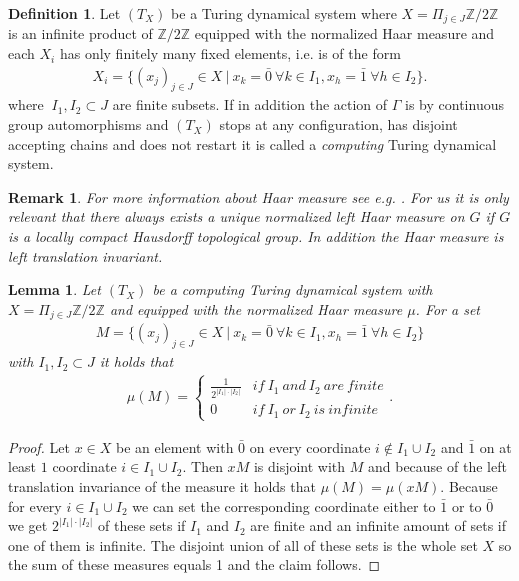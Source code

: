 \documentclass[12pt,a4paper]{scrartcl}
\theoremstyle{plain}
\newtheorem{Lemma}[Theorem]{Lemma}
\newtheorem{Remark}[Theorem]{Remark}
\theoremstyle{definition}
\newtheorem{Definition}[Theorem]{Definition}
\numberwithin{equation}{section}
\newcommand{\2}{\mathbb{Z} / 2 \mathbb{Z}}
\newcommand{\1}{\bar{1}}
\newcommand{\0}{\bar{0}}
\begin{document}
\begin{Definition}
	Let $(T_X)$ be a Turing dynamical system where $X = \Pi_{j \in J} \2$ is an infinite product of $\2$ equipped with the normalized Haar measure and each $X_i$  has only finitely many fixed elements, i.e. is of the form 
	\begin{align*}
		X_i = \{(x_j)_{j \in J} \in X \ | \ x_k = \0 \ \forall k \in I_1, x_h = \1 \ \forall h \in I_2\}.
	\end{align*}
	where $\ I_1, I_2 \subset J$ are finite subsets.
	If in addition the action of $\Gamma$ is by continuous group automorphisms and $(T_X)$ stops at any configuration, has disjoint accepting chains and does not restart it is called a \emph{computing} Turing dynamical system.
\end{Definition}
\begin{Remark}
	For more information about Haar measure see e.g. . For us it is only relevant that there always exists a unique normalized left Haar measure on $G$ if $G$ is a locally compact Hausdorff topological group. In addition the Haar measure is left translation invariant.
\end{Remark}
\begin{Lemma}
	Let $(T_X)$ be a computing Turing dynamical system with $X = \Pi_{j \in J} \2$ and equipped with the normalized Haar measure $\mu$. For a set 
	\begin{align*}
		M = \{(x_j)_{j \in J} \in X \ | \ x_k = \0 \ \forall k \in I_1, x_h = \1 \ \forall h \in I_2 \}
	\end{align*}
	with $I_1, I_2 \subset J$ it holds that
	\begin{align*}
	\mu (M) = \begin{cases}
	\frac{1}{2^{|I_1| \cdot |I_2|}} & if \ I_1 \ and \ I_2 \ are \ finite \\
	0 & if \ I_1 \ or \ I_2 \ is \ infinite
	\end{cases}.
	\end{align*}
\end{Lemma}
\begin{proof}
	Let $x \in X$ be an element with $\0$ on every coordinate $i \notin I_1 \cup I_2$ and $\1$ on at least $1$ coordinate $i \in I_1 \cup I_2$. Then $xM$ is disjoint with $M$ and because of the left translation invariance of the measure it holds that $\mu (M) = \mu (xM)$. Because for every $i \in I_1 \cup I_2$ we can set the corresponding coordinate either to $\1$ or to $\0$ we get $2^{|I_1| \cdot |I_2|}$ of these sets if $I_1$ and $I_2$ are finite and an infinite amount of sets if one of them is infinite. The disjoint union of all of these sets is the whole set $X$ so the sum of these measures equals 1 and the claim follows.
\end{proof}
 
\end{document}
